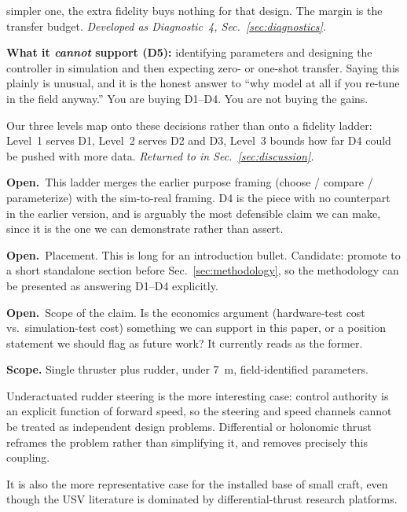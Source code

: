 \documentclass[11pt]{article}
\newcommand{\Open}{\textbf{Open.}\ }
\begin{document}
\begin{outline}
\begin{outline}
    simpler one, the extra fidelity buys nothing for that design. The margin is the
    transfer budget. \emph{Developed as Diagnostic~4, Sec.~\ref{sec:diagnostics}.}
  \item \textbf{What it \emph{cannot} support (D5):} identifying parameters and
    designing the controller in simulation and then expecting zero- or one-shot
    transfer. Saying this plainly is unusual, and it is the honest answer to ``why
    model at all if you re-tune in the field anyway.'' You are buying D1--D4. You are
    not buying the gains.
  \item Our three levels map onto these decisions rather than onto a fidelity ladder:
    Level~1 serves D1, Level~2 serves D2 and D3, Level~3 bounds how far D4 could be
    pushed with more data. \emph{Returned to in Sec.~\ref{sec:discussion}.}
  \item \Open This ladder merges the earlier purpose framing (choose / compare /
    parameterize) with the sim-to-real framing. D4 is the piece with no counterpart
    in the earlier version, and is arguably the most defensible claim we can make,
    since it is the one we can demonstrate rather than assert.
  \item \Open Placement. This is long for an introduction bullet. Candidate: promote to a short standalone section before
    Sec.~\ref{sec:methodology}, so the methodology can be presented as answering
    D1--D4 explicitly.
  \item \Open Scope of the claim. Is the economics argument (hardware-test cost vs.\
    simulation-test cost) something we can support in this paper, or a position
    statement we should flag as future work? It currently reads as the former.
  \end{outline}
\item \textbf{Scope.} Single thruster plus rudder, under 7~m, field-identified
  parameters.
  \begin{outline}
  \item Underactuated rudder steering is the more interesting case: control
    authority is an explicit function of forward speed, so the steering and speed
    channels cannot be treated as independent design problems. Differential or
    holonomic thrust reframes the problem rather than simplifying it, and removes
    precisely this coupling.
  \item It is also the more representative case for the installed base of small
    craft, even though the USV literature is dominated by differential-thrust
    research platforms.

\end{outline}
\end{outline}
\end{document}
